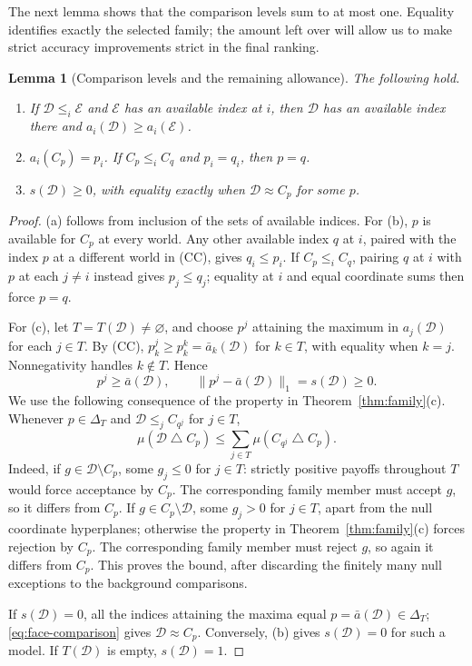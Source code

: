 \documentclass[11pt]{article}
\newtheorem{lemma}[theorem]{Lemma}
\theoremstyle{remark}
\newcommand{\sd}{\mathbin{\triangle}}
\newcommand{\Dscr}{\mathcal D}
\newcommand{\Escr}{\mathcal E}
\begin{document}
The next lemma shows that the comparison levels sum to at most one.
Equality identifies exactly the selected family; the amount left over will
allow us to make strict accuracy improvements strict in the final ranking.

\begin{lemma}[Comparison levels and the remaining allowance]\label{lem:levels}
The following hold.
\begin{enumerate}[label=(\alph*)]
\item If $\Dscr\le_i\Escr$ and $\Escr$ has an available index at $i$, then $\Dscr$ has an available index there and
$a_i(\Dscr)\ge a_i(\Escr)$.
\item $a_i(C_{p})=p_i$. If $C_{p}\le_iC_{q}$ and $p_i=q_i$, then $p=q$.
\item $s(\Dscr)\ge0$, with equality exactly when $\Dscr\approx C_{p}$ for some $p$.
\end{enumerate}
\end{lemma}
\begin{proof}
(a) follows from inclusion of the sets of available indices. For (b), $p$ is available for $C_p$ at every world. Any other available index $q$ at $i$, paired with the index $p$ at a different
world in (CC), gives $q_i\le p_i$. If $C_{p}\le_iC_{q}$, pairing $q$ at $i$
with $p$ at each $j\ne i$ instead gives $p_j\le q_j$; equality at $i$ and
equal coordinate sums then force $p=q$.

For (c), let $T=T(\Dscr)\ne\varnothing$, and choose $p^j$ attaining the maximum in $a_j(\Dscr)$
for each $j\in T$. By (CC), $p^j_k\ge p^k_k=\bar a_k(\Dscr)$ for $k\in T$,
with equality when $k=j$. Nonnegativity handles $k\notin T$. Hence
\begin{equation}
 p^j\ge\bar a(\Dscr),\qquad \|p^j-\bar a(\Dscr)\|_1=s(\Dscr)\ge0.
 \label{eq:cover-distance}
\end{equation}
We use the following consequence of the property in Theorem~\ref{thm:family}(c). Whenever $p\in\Delta_T$
and $\Dscr\le_jC_{q^j}$ for $j\in T$,
\begin{equation}
 \mu(\Dscr\sd C_{p})\le\sum_{j\in T}\mu(C_{q^j}\sd C_{p}).
 \label{eq:face-comparison}
\end{equation}
Indeed, if $g\in \Dscr\setminus C_{p}$, some $g_j\le0$ for $j\in T$:
strictly positive payoffs throughout $T$ would force acceptance by $C_{p}$.
The corresponding family member must accept $g$, so it differs from $C_{p}$.
If $g\in C_{p}\setminus \Dscr$, some $g_j>0$ for $j\in T$, apart from the null
coordinate hyperplanes; otherwise the property in Theorem~\ref{thm:family}(c) forces rejection by $C_{p}$.
The corresponding family member must reject $g$, so again it differs from $C_{p}$.
This proves the bound, after discarding the finitely many null exceptions
to the background comparisons.

If $s(\Dscr)=0$, all the indices attaining the maxima equal $p=\bar a(\Dscr)\in\Delta_T$;
\eqref{eq:face-comparison} gives $\Dscr\approx C_{p}$. Conversely, (b) gives
$s(\Dscr)=0$ for such a model. If $T(\Dscr)$ is empty, $s(\Dscr)=1$.
\end{proof}
\end{document}
